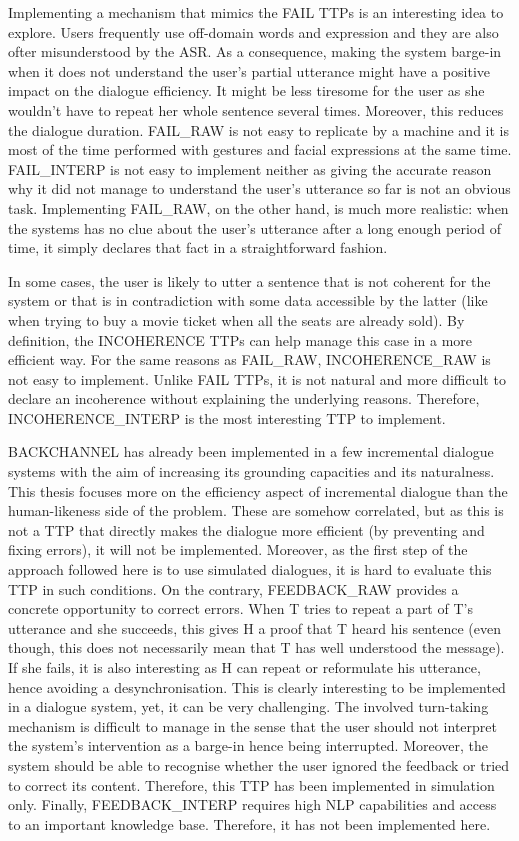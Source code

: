 				Implementing a mechanism that mimics the FAIL TTPs is an interesting idea to explore. Users frequently use off-domain words and expression \cite{Ghigi2014} and they are also ofter misunderstood by the ASR. As a consequence, making the system barge-in when it does not understand the user's partial utterance might have a positive impact on the dialogue efficiency. It might be less tiresome for the user as she wouldn't have to repeat her whole sentence several times. Moreover, this reduces the dialogue duration. FAIL\_RAW is not easy to replicate by a machine and it is most of the time performed with gestures and facial expressions at the same time. FAIL\_INTERP is not easy to implement neither as giving the accurate reason why it did not manage to understand the user's utterance so far is not an obvious task. Implementing FAIL\_RAW, on the other hand, is much more realistic: when the systems has no clue about the user's utterance after a long enough period of time, it simply declares that fact in a straightforward fashion.

				In some cases, the user is likely to utter a sentence that is not coherent for the system or that is in contradiction with some data accessible by the latter (like when trying to buy a movie ticket when all the seats are already sold). By definition, the INCOHERENCE TTPs can help manage this case in a more efficient way. For the same reasons as FAIL\_RAW, INCOHERENCE\_RAW is not easy to implement. Unlike FAIL TTPs, it is not natural and more difficult to declare an incoherence without explaining the underlying reasons. Therefore, INCOHERENCE\_INTERP is the most interesting TTP to implement.

				BACKCHANNEL has already been implemented in a few incremental dialogue systems \cite{Meena2013,Hastie2013} with the aim of increasing its grounding capacities and its naturalness. This thesis focuses more on the efficiency aspect of incremental dialogue than the human-likeness side of the problem. These are somehow correlated, but as this is not a TTP that directly makes the dialogue more efficient (by preventing and fixing errors), it will not be implemented. Moreover, as the first step of the approach followed here is to use simulated dialogues, it is hard to evaluate this TTP in such conditions. On the contrary, FEEDBACK\_RAW provides a concrete opportunity to correct errors. When T tries to repeat a part of T's utterance and she succeeds, this gives H a proof that T heard his sentence (even though, this does not necessarily mean that T has well understood the message). If she fails, it is also interesting as H can repeat or reformulate his utterance, hence avoiding a desynchronisation. This is clearly interesting to be implemented in a dialogue system, yet, it can be very challenging. The involved turn-taking mechanism is difficult to manage in the sense that the user should not interpret the system's intervention as a barge-in hence being interrupted. Moreover, the system should be able to recognise whether the user ignored the feedback or tried to correct its content. Therefore, this TTP has been implemented in simulation only. Finally, FEEDBACK\_INTERP requires high NLP capabilities and access to an important knowledge base. Therefore, it has not been implemented here.


